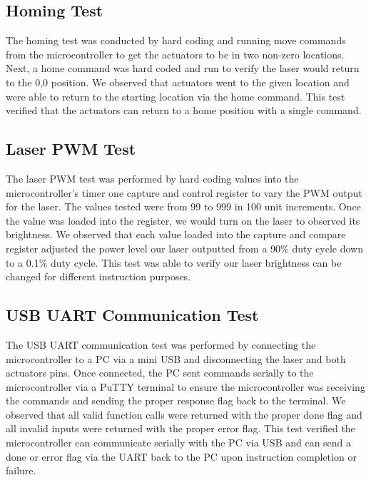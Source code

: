 \documentclass[11pt]{LaTeX-Classes/math-hw}
\begin{document}
\subsection{Homing Test}
The homing test was conducted by hard coding and running move commands from the microcontroller to get the actuators to be in two non-zero locations. Next, a home command was hard coded and run to verify the laser would return to the 0,0 position. We observed that actuators went to the given location and were able to return to the starting location via the home command. This test verified that the actuators can return to a home position with a single command.  

\subsection{Laser PWM Test}
The laser PWM test was performed by hard coding values into the microcontroller's timer one capture and control register to vary the PWM output for the laser. The values tested were from 99 to 999 in 100 unit increments. Once the value was loaded into the register, we would turn on the laser to observed its brightness. We observed that each value loaded into the capture and compare register adjusted the power level our laser outputted from a 90\% duty cycle down to a 0.1\% duty cycle. This test was able to verify our laser brightness can be changed for different instruction purposes.
 
\subsection{USB UART Communication Test}
The USB UART communication test was performed by connecting the microcontroller to a PC via a mini USB and disconnecting the laser and both actuators pins. Once connected, the PC sent commands serially to the microcontroller via a PuTTY terminal to ensure the microcontroller was receiving the commands and sending the proper response flag back to the terminal. We observed that all valid function calls were returned with the proper done flag and all invalid inputs were returned with the proper error flag. This test verified the microcontroller can communicate serially with the PC via USB and can send a done or error flag via the UART back to the PC upon instruction completion or failure.
\end{document}
